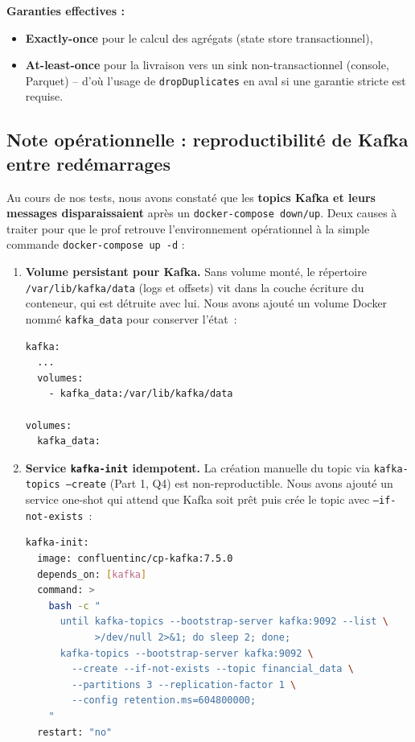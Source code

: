 \documentclass{RapportINPTCLOUD}
\begin{document}
\textbf{Garanties effectives :}
\begin{itemize}[leftmargin=2em]
    \item \textbf{Exactly-once} pour le calcul des agr\'{e}gats (state store transactionnel),
    \item \textbf{At-least-once} pour la livraison vers un sink non-transactionnel (console, Parquet) -- d'o\`{u} l'usage de \texttt{dropDuplicates} en aval si une garantie stricte est requise.
\end{itemize}

\subsection{Note op\'{e}rationnelle : reproductibilit\'{e} de Kafka entre red\'{e}marrages}

Au cours de nos tests, nous avons constat\'{e} que les \textbf{topics Kafka et leurs messages disparaissaient} apr\`{e}s un \texttt{docker-compose down/up}. Deux causes \`{a} traiter pour que le prof retrouve l'environnement op\'{e}rationnel \`{a} la simple commande \texttt{docker-compose up -d} :

\begin{enumerate}[leftmargin=2em]
    \item \textbf{Volume persistant pour Kafka.} Sans volume mont\'{e}, le r\'{e}pertoire \texttt{/var/lib/kafka/data} (logs et offsets) vit dans la couche \'{e}criture du conteneur, qui est d\'{e}truite avec lui. Nous avons ajout\'{e} un volume Docker nomm\'{e} \texttt{kafka\_data} pour conserver l'\'{e}tat~:
\begin{lstlisting}[style=code, language=bash]
kafka:
  ...
  volumes:
    - kafka_data:/var/lib/kafka/data

volumes:
  kafka_data:
\end{lstlisting}
    \item \textbf{Service \texttt{kafka-init} idempotent.} La cr\'{e}ation manuelle du topic via \texttt{kafka-topics --create} (Part 1, Q4) est non-reproductible. Nous avons ajout\'{e} un service \og one-shot\fg{} qui attend que Kafka soit pr\^{e}t puis cr\'{e}e le topic avec \texttt{--if-not-exists}~:
\begin{lstlisting}[style=code, language=bash]
kafka-init:
  image: confluentinc/cp-kafka:7.5.0
  depends_on: [kafka]
  command: >
    bash -c "
      until kafka-topics --bootstrap-server kafka:9092 --list \
            >/dev/null 2>&1; do sleep 2; done;
      kafka-topics --bootstrap-server kafka:9092 \
        --create --if-not-exists --topic financial_data \
        --partitions 3 --replication-factor 1 \
        --config retention.ms=604800000;
    "
  restart: "no"
\end{lstlisting}
\end{enumerate}
\end{document}
